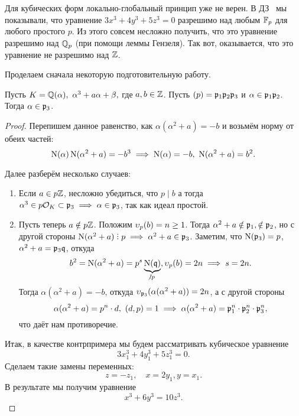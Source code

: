 	  	Для кубических форм локально-глобальный принцип уже не верен. В ДЗ~\label{hw:10} мы показывали, что уравнение $3x^3 + 4y^3 + 5z^3 = 0$ разрешимо над любым $\mathbb{F}_{p}$ для любого простого $p$. Из этого совсем несложно получить, что это уравнение разрешимо над $\mathbb{Q}_{p}$ (при помощи леммы Гензеля). Так вот, оказывается, что это уравнение не разрешимо над $\mathbb{Z}$.

	  Проделаем сначала некоторую подготовительную работу. 

	  \begin{statement}[ДЗ 11, задача 3]\label{prop-alpha} 
	  	Пусть $K = \mathbb{Q}(\alpha), \ \alpha^3 + a \alpha + \beta,$ где $a, b \in \mathbb{Z}$. Пусть $(p) = \mathfrak{p}_1 \mathfrak{p}_2 \mathfrak{p}_3$ и $\alpha \in \mathfrak{p}_1 \mathfrak{p}_2$. Тогда $\alpha \in \mathfrak{p}_3$.
	  \end{statement}
	  \begin{proof}
	  	Перепишем данное равенство, как $\alpha(\alpha^2 + a) = - b$ и возьмём норму от обеих частей: 
	  	\[
	  		\operatorname{\mathrm{N}}(\alpha)\operatorname{\mathrm{N}}(\alpha^2 + a) = - b^3 \implies \operatorname{\mathrm{N}}(\alpha) = -b, \ \operatorname{\mathrm{N}}(\alpha^2 + a) = b^2. 
	  	\]

	  	Далее разберём несколько случаев: 
	  	\begin{enumerate}
	  		\item Если $a \in p\mathbb{Z}$, несложно убедиться, что $p \mid b$ а тогда $\alpha^3 \in p\mathcal{O}_{K} \subset \mathfrak{p}_{3} \implies \alpha \in \mathfrak{p}_{3}$, так как идеал простой. 

	  		\item Пусть теперь $a \notin p\mathbb{Z}$. Положим $\upsilon_{p}(b) = n \ge 1$. Тогда $\alpha^2 + a \notin \mathfrak{p}_1, \notin \mathfrak{p}_{2}$, но с другой стороны $\Nm(\alpha^2 + a) \divby p \implies \alpha^2 + a \in \fp_{3}$. Заметим, что $\operatorname{\mathrm{N}}(\mathfrak{p}_3) = p$, $\alpha^2 + a = \mathfrak{p}_{3} \mathfrak{q}$, откуда 
	  		\[
	  			b^2 = \Nm(\alpha^2 + a) = p^s \underbrace{\Nm(\fq)}_{\notdivby p}, \v_{p}(b) = 2n \implies s = 2n. 
	  		\]
	  		Тогда $\alpha(\alpha^2 + a) = -b$, откуда $\upsilon_{\mathfrak{p}_3}(\alpha(\alpha^2 + a)) = 2n$, а с другой стороны
	  		\[
	  		  	\alpha(\alpha^2 + a) = p^n \cdot d, \ (d, p ) = 1 \implies \alpha(\alpha^2 + a) = \mathfrak{p}_1^n \cdot \mathfrak{p}_2^n \cdot \mathfrak{p}_{3}^n,
	  		  \]  
	  		  что даёт нам противоречие. 
	  		
	  	\end{enumerate}




	  	Итак, в качестве контрпримера мы будем рассматривать кубическое уравнение 
	  	\[
	  		3x_1^3 + 4y_1^3 + 5z_1^3 = 0.
	  	\]
	  	Сделаем такие замены переменных: 
	  	\[
	  		z = -z_1, \quad x = 2y_1, y = x_1.
	  	\]
	  	В результате мы получим уравнение 
	  	\[
	  		x^3 + 6y^3 = 10z^3.
	  	\]


\end{proof}
